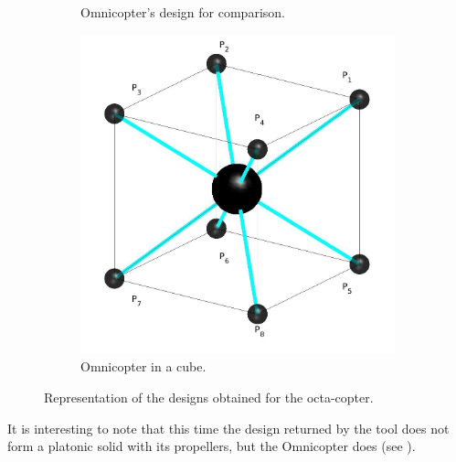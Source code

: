{\begin{figure}[!ht]
{\begin{subfigure}[b]{0.6\textwidth}
    \caption{Omnicopter's design for comparison.} \label{fig:Octacopter_resultb}
  \end{subfigure}
  \hspace*{\fill} %
  \begin{subfigure}[b]{0.5\textwidth}
    \includegraphics[width=\linewidth]{images/Octa_cube.jpg}
    \caption{Omnicopter in a cube.} \label{fig:Octacopter_resultc}
  \end{subfigure}}
  \caption{Representation of the designs obtained for the octa-copter.}
  \label{fig:Octacopter_result}
\end{figure}

It is interesting to note that this time the design returned by the tool does not
form a platonic solid with its propellers, but the Omnicopter does (see
).

}
